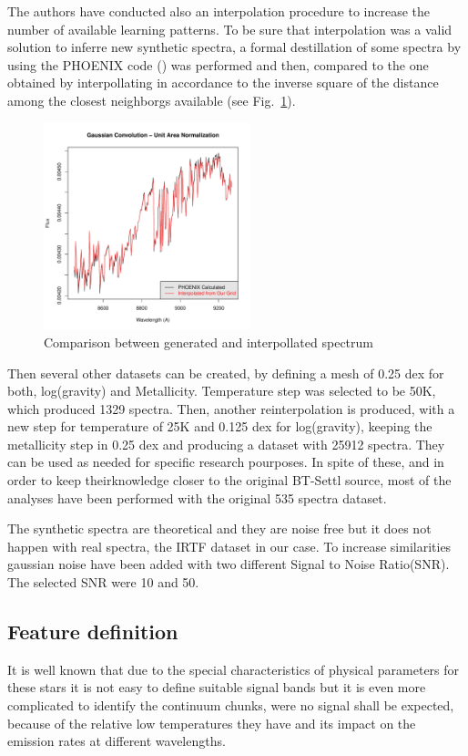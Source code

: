 {
The authors have conducted also an interpolation procedure to increase the number 
of available learning patterns.
To be sure that interpolation was a valid solution to inferre new synthetic spectra,
a formal destillation of some spectra by using the 
PHOENIX code (\cite{fuhrmeister2005phoenix}) 
was performed and then, compared to the one obtained by interpollating in accordance 
to the inverse square of the distance among the closest neighborgs available 
(see Fig.~\ref{fig:comp_gen_inter}).
}

\begin {figure}
 \begin{center}
 \includegraphics[width=6cm]{figs/intgrid4_gauss.pdf}
 \caption{Comparison between generated and interpollated spectrum}
 \label{fig:comp_gen_inter}
 \end{center}
\end {figure}

{
Then several other datasets can be created, by defining a mesh of 0.25 dex for 
both, log(gravity) and Metallicity. Temperature step was selected to be 50K, 
which produced 1329 spectra.
Then, another reinterpolation is produced, with a new 
step for temperature of 25K and 0.125 dex for log(gravity), 
keeping the metallicity step in 0.25 dex and producing 
a dataset with 25912 spectra. They can be used as needed for specific 
research pourposes. In spite of these, and in order to keep theirknowledge 
closer to the original BT-Settl source, most of the analyses have been 
performed with the original 535 spectra dataset.
}

{
The synthetic spectra are theoretical and they are noise free but it 
does not happen with real spectra, the IRTF dataset in our case.
To increase similarities gaussian noise have been added with two 
different Signal to Noise Ratio(SNR). The selected SNR were 10 and 50.
}

\subsection{Feature definition}
\label{subsec:FD}
{
It is well known that due to the special characteristics of 
physical parameters for these stars it is not easy to define 
suitable signal bands but it is even more complicated to identify 
the continuum chunks, were no signal shall be expected, because of the 
relative low temperatures they have and its impact on the emission 
rates at different wavelengths.
}

